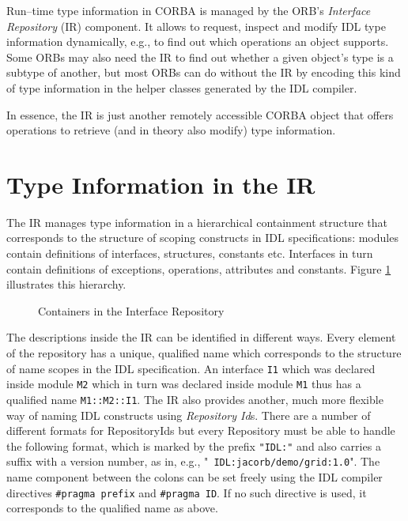\documentclass[12pt]{scrbook}
\begin{document}
Run--time  type information  in CORBA  is  managed by  the ORB's  {\it
Interface Repository}  (IR) component.  It allows  to request, inspect
and modify IDL  type information dynamically, e.g., to  find out which
operations an object supports. Some ORBs  may also need the IR to find
out whether  a given object's type  is a subtype of  another, but most
ORBs can do  without the IR by encoding this  kind of type information
in the helper classes generated by the IDL compiler.

In essence,  the IR is  just another remotely accessible  CORBA object
that offers  operations to retrieve  (and in theory also  modify) type
information.

\section{Type Information in the IR}

The  IR  manages  type   information  in  a  hierarchical  containment
structure that  corresponds to the structure of  scoping constructs in
IDL  specifications:   modules  contain  definitions   of  interfaces,
structures, constants  etc. Interfaces in turn  contain definitions of
exceptions, operations, attributes  and constants. Figure \ref{IR-fig}
illustrates this hierarchy.

\begin{figure}[htb]
\centerline{}
\caption{Containers in the Interface Repository}
\label{IR-fig}
\end{figure}

The  descriptions  inside  the  IR  can  be  identified  in  different
ways. Every  element of  the repository has  a unique,  qualified name
which  corresponds  to  the  structure  of  name  scopes  in  the  IDL
specification. An interface {\tt  I1} which was declared inside module
{\tt M2} which in turn was  declared inside module {\tt M1} thus has a
qualified name  {\tt M1::M2::I1}. The  IR also provides  another, much
more   flexible   way   of    naming   IDL   constructs   using   {\it
Repository Id}s.  There   are  a   number  of  different   formats  for
RepositoryIds  but  every  Repository  must  be  able  to  handle  the
following format, which is marked  by the prefix {\tt "IDL:"} and also
carries  a  suffix   with  a  version  number,  as   in,  e.g.,  "{\tt
IDL:jacorb/demo/grid:1.0}". The name  component between the colons can
be set freely using the  IDL compiler directives {\tt \#pragma prefix}
and {\tt \#pragma ID}. If no such directive is used, it corresponds to
the qualified name as above.
\end{document}

